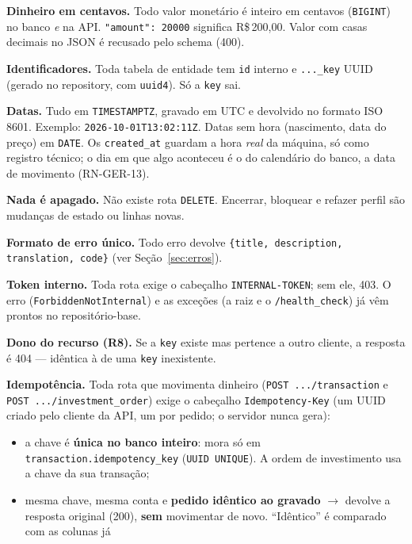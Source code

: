 \documentclass[11pt,a4paper]{article}
\newcommand{\obr}{\textbf{[OBR]}}          %
\newcommand{\dec}{\textbf{[DEC]}}          %
\newcommand{\rs}{R\$\,}
\newcommand{\tb}[1]{\texttt{#1}}           %
\begin{document}
\begin{regras}
  \item[RN-GER-01 \obr] \textbf{Dinheiro em centavos.} Todo valor monetário é inteiro em
  centavos (\tb{BIGINT}) no banco \emph{e} na API. \tb{"amount": 20000} significa \rs 200,00.
  Valor com casas decimais no JSON é recusado pelo schema (400).
  \item[RN-GER-02 \obr] \textbf{Identificadores.} Toda tabela de entidade tem \tb{id} interno e
  \tb{..._key} UUID (gerado no repository, com \tb{uuid4}). Só a \tb{key} sai.
  \item[RN-GER-03 \dec] \textbf{Datas.} Tudo em \tb{TIMESTAMPTZ}, gravado em UTC e devolvido no
  formato ISO 8601. Exemplo: \tb{2026-10-01T13:02:11Z}. Datas sem hora (nascimento, data do
  preço) em \tb{DATE}. Os \tb{created_at} guardam a hora \emph{real} da máquina, só como registro
  técnico; o dia em que algo aconteceu é o do calendário do banco, a data de movimento (RN-GER-13).
  \item[RN-GER-04 \obr] \textbf{Nada é apagado.} Não existe rota \tb{DELETE}. Encerrar, bloquear e
  refazer perfil são mudanças de estado ou linhas novas.
  \item[RN-GER-05 \obr] \textbf{Formato de erro único.} Todo erro devolve
  \tb{\{title, description, translation, code\}} (ver Seção~\ref{sec:erros}).
  \item[RN-GER-06 \obr] \textbf{Token interno.} Toda rota exige o cabeçalho \tb{INTERNAL-TOKEN};
  sem ele, 403. O erro (\tb{ForbiddenNotInternal}) e as exceções (a raiz e o
  \tb{/health_check}) já vêm prontos no repositório-base.
  \item[RN-GER-07 \obr] \textbf{Dono do recurso (R8).} Se a \tb{key} existe mas pertence a outro
  cliente, a resposta é 404 --- idêntica à de uma \tb{key} inexistente.
  \item[RN-GER-08 \obr] \textbf{Idempotência.} Toda rota que movimenta dinheiro
  (\tb{POST .../transaction} e \tb{POST .../investment_order}) exige o cabeçalho
  \tb{Idempotency-Key} (um UUID criado pelo cliente da API, um por pedido; o servidor nunca gera):
  \begin{itemize}
    \item a chave é \textbf{única no banco inteiro}: mora só em \tb{transaction.idempotency_key}
          (\tb{UUID UNIQUE}). A ordem de investimento usa a chave da sua transação;
    \item mesma chave, mesma conta e \textbf{pedido idêntico ao gravado} $\to$ devolve a resposta
          original (200), \textbf{sem} movimentar de novo. ``Idêntico'' é comparado com as colunas já

\end{itemize}
\end{regras}
\end{document}
